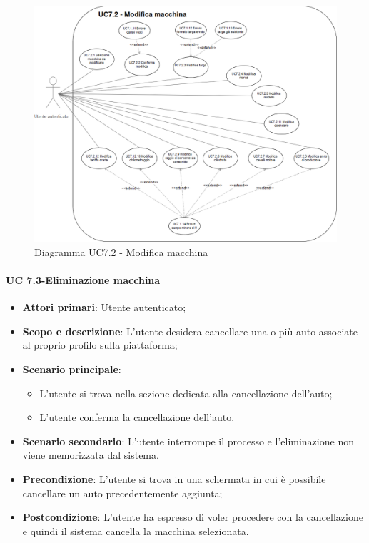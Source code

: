     
    \begin{figure}[h!]
           \begin{center}
           \includegraphics[scale=0.35]{immagini/72.png}    
           \caption{Diagramma UC7.2 - Modifica macchina}
           \end{center}
           \end{figure}  
            
    \newpage
    
    \paragraph{UC 7.3-Eliminazione macchina}
    \begin{itemize}
                \item \textbf{Attori primari}: Utente autenticato;
               
                 \item \textbf{Scopo e descrizione}: L'utente desidera cancellare una o più auto associate al proprio profilo sulla piattaforma;
                 \item \textbf{Scenario principale}: 
                 \begin{itemize}
                     \item L'utente si trova nella sezione dedicata alla cancellazione dell'auto;
                     \item L'utente conferma la cancellazione dell'auto.
                 \end{itemize}
                 \item \textbf{Scenario secondario}: L'utente interrompe il processo e l'eliminazione non viene memorizzata dal sistema.
                 \item \textbf{Precondizione}: L'utente si trova in una schermata in cui è possibile cancellare un auto precedentemente aggiunta;
                 \item \textbf{Postcondizione}: L'utente ha espresso di voler procedere con la cancellazione e quindi il sistema cancella la macchina selezionata.
                 \end{itemize}
                 
